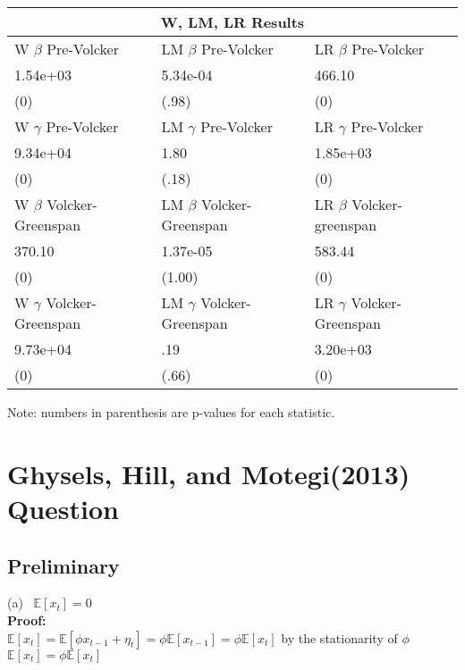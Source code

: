 \documentclass[11pt]{article}
\theoremstyle{definition}
\begin{document}
\vspace{2.5mm}
\noindent
\begin{center}
\begin{tabular}{|l| l |l|}
\hline\hline
\multicolumn{3}{c}{\textbf{W, LM, LR Results}} \\
\hline\hline \rowcolor{Gray}
 W $\beta$ Pre-Volcker & LM $\beta$ Pre-Volcker & LR $\beta$ Pre-Volcker  \\
 \hline
 1.54e+03 & 5.34e-04 & 466.10 \\
 \hline
 (0) & (.98) & (0) \\
\hline  \rowcolor{Gray}
W $\gamma$ Pre-Volcker & LM $\gamma$ Pre-Volcker & LR $\gamma$ Pre-Volcker  \\
\hline
9.34e+04 & 1.80 & 1.85e+03 \\
\hline
 (0) & (.18) & (0) \\
\hline  \rowcolor{Gray}
W $\beta$ Volcker-Greenspan & LM $\beta$ Volcker-Greenspan & LR $\beta$ Volcker-greenspan  \\
\hline
370.10 & 1.37e-05 & 583.44 \\
\hline
 (0) & (1.00) & (0) \\
\hline  \rowcolor{Gray}
W $\gamma$ Volcker-Greenspan & LM $\gamma$ Volcker-Greenspan & LR $\gamma$ Volcker-Greenspan  \\
\hline
9.73e+04 & .19 & 3.20e+03\\
\hline
 (0) & (.66) & (0) \\
  \hline\hline
\end{tabular} 
\end{center} 
Note: numbers in parenthesis are p-values for each statistic.

\section{Ghysels, Hill, and Motegi(2013) Question}
\subsection{Preliminary}

(a) \ $\mathbb{E}[x_{t}]=0$ \\
\textbf{Proof:} \\

$\mathbb{E}[x_{t}]=\mathbb{E}\left[\phi x_{t-1} +\eta_{t}\right]=\phi\mathbb{E}[x_{t-1}]=\phi\mathbb{E}[x_{t}]$ by the stationarity of $\phi$ \\

$\mathbb{E}[x_{t}]=\phi\mathbb{E}[x_{t}]$ \\
\end{document}
